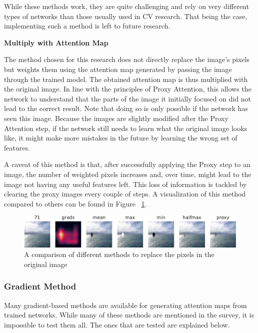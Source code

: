 \documentclass[a4paper,11pt,openright]{book}
\begin{document}
While these methods work, they are quite challenging and rely on very different types of networks than those usually used in CV research. That being the case, implementing such a method is left to future research.

\textbf{Multiply with Attention Map} \label{sec:mult_attention}

The method chosen for this research does not directly replace the image's pixels but weights them using the attention map generated by passing the image through the trained model.
The obtained attention map is thus multiplied with the original image. In line with the principles of Proxy Attention, this allows the network to understand that the parts of the image it initially focused on did not lead to the correct result. Note that doing so is only possible if the network has seen this image. Because the images are slightly modified after the Proxy Attention step, if the network still needs to learn what the original image looks like, it might make more mistakes in the future by learning the wrong set of features.

A caveat of this method is that, after successfully applying the Proxy step to an image, the number of weighted pixels increases and, over time, might lead to the image not having any useful features left. This loss of information is tackled by clearing the proxy images every couple of steps.
A visualization of this method compared to others can be found in Figure ~\ref{fig:methods}.

\begin{figure}[h]
    \centering
    \includegraphics[width=1\textwidth]{images/methods-crop.pdf}
    \caption{A comparison of different methods to replace the pixels in the original image}
    \label{fig:methods}
\end{figure}

\subsubsection{Gradient Method} \label{sec:grad_method}
Many gradient-based methods are available for generating attention maps from trained networks. While many of these methods are mentioned in the survey, it is impossible to test them all. The ones that are tested are explained below.
\end{document}
